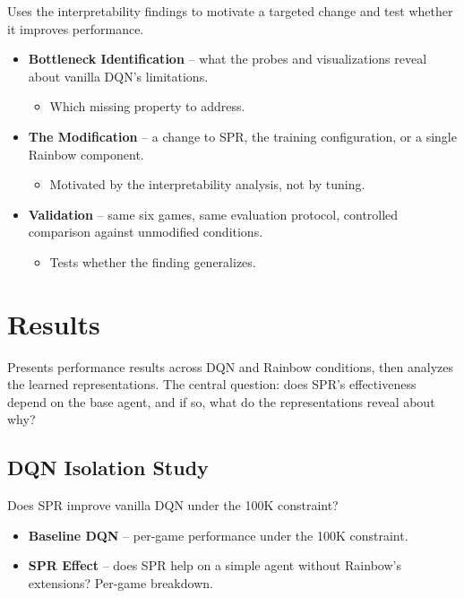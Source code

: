 \documentclass[11pt]{article}
\begin{document}
\noindent Uses the interpretability findings to motivate a targeted
change and test whether it improves performance.

\begin{itemize}
\item \textbf{Bottleneck Identification} -- what the probes and
  visualizations reveal about vanilla DQN's limitations.
  \begin{itemize}[label=$\circ$, itemsep=0.2em, parsep=0pt, topsep=0pt, partopsep=0pt]
  \item Which missing property to address.
  \end{itemize}
\item \textbf{The Modification} -- a change to SPR, the training
  configuration, or a single Rainbow component.
  \begin{itemize}[label=$\circ$, itemsep=0.2em, parsep=0pt, topsep=0pt, partopsep=0pt]
  \item Motivated by the interpretability analysis, not by
    tuning.
  \end{itemize}
\item \textbf{Validation} -- same six games, same evaluation
  protocol, controlled comparison against unmodified conditions.
  \begin{itemize}[label=$\circ$, itemsep=0.2em, parsep=0pt, topsep=0pt, partopsep=0pt]
  \item Tests whether the finding generalizes.
  \end{itemize}
\end{itemize}

\section{Results}

\noindent Presents performance results across DQN and Rainbow
conditions, then analyzes the learned representations. The central
question: does SPR's effectiveness depend on the base agent, and if
so, what do the representations reveal about why?

\subsection{DQN Isolation Study}

\noindent Does SPR improve vanilla DQN under the 100K constraint?

\begin{itemize}
\item \textbf{Baseline DQN} -- per-game performance under the
  100K constraint.
\item \textbf{SPR Effect} -- does SPR help on a simple agent
  without Rainbow's extensions? Per-game breakdown.
\end{itemize}
\end{document}
